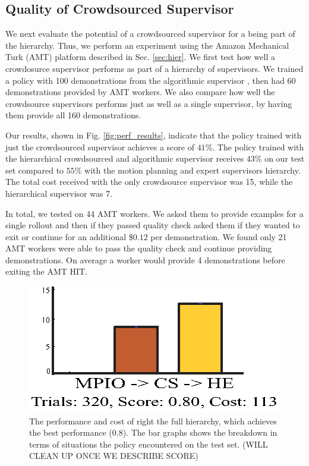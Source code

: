\documentclass[10pt, conference]{ieeeconf}      %
\begin{document}
\subsection{Quality of Crowdsourced Supervisor}
We next evaluate the potential of a  crowdsourced supervisor for a being part of the hierarchy. Thus, we perform an
experiment using the Amazon Mechanical Turk (AMT) platform described in Sec. \ref{sec:hier}. We  first test how well a crowdosurce supervisor
performs as part of a hierarchy of supervisors. We trained a policy with 100  demonstrations  from the algorithmic supervisor , then had 60 demonstrations provided by AMT workers. We also compare how well the crowdsource supervisors performs just as well as a single supervisor,  by having them provide all 160 demonstrations.

Our results, shown in Fig. \ref{fig:perf_results}, indicate that the policy trained with just the crowdsourced supervisor achieves
a score of $41\%$. The policy trained with the hierarchical crowdsourced and algorithmic supervisor receives $43\%$ on our test set compared to $55\%$ with the motion planning and expert supervisors hierarchy. The total cost received with the only crowdsource supervisor was 15, while the hierarchical supervisor was 7. 

In total, we tested on 44 AMT workers. We asked them to provide examples for a single rollout and then if they passed quality check asked them if they wanted to exit or continue for an additional \$$0.12$ per demonstration. We found only 21 AMT workers were able to pass the quality check and continue providing demonstrations. On average a worker would provide 4 demonstrations before exiting the AMT HIT. 


\begin{figure}[t]
\includegraphics{f_figs/big_data.eps}
\centering 
\caption{ \footnotesize The performance and cost of right the full hierarchy, which achieves the best performance (0.8). The bar graphs shows the breakdown in terms of situations the policy encountered on the test set.  (WILL CLEAN UP ONCE WE DESCRIBE SCORE)   }
\vspace*{-20pt}
\label{fig:big_data}
\end{figure}
\end{document}
